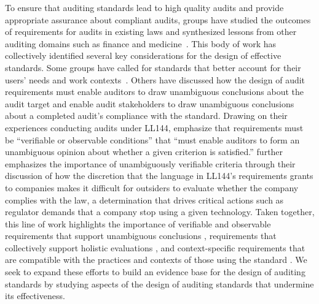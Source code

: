 To ensure that auditing standards lead to high quality audits and provide appropriate assurance about compliant audits, groups have studied the outcomes of requirements for audits in existing laws and synthesized lessons from other auditing domains such as finance and medicine~\cite{raji2022outsider, wright2024null, groves2024auditing, lam2024framework, gerchick2025auditing}. This body of work has collectively identified several key considerations for the design of effective standards. Some groups have called for standards that better account for their users' needs and work contexts~\cite{ojewale2025towards, schor2024mind}. Others have discussed how the design of audit requirements must enable auditors to draw unambiguous conclusions about the audit target and enable audit stakeholders to draw unambiguous conclusions about a completed audit's compliance with the standard. Drawing on their experiences conducting audits under LL144, \citet{lam2024framework} emphasize that requirements must be ``verifiable or observable conditions'' that ``must enable auditors to form an unambiguous opinion about whether a given criterion is satisfied.'' \citet{wright2024null} further emphasizes the importance of unambiguously verifiable criteria through their discussion of how the discretion that the language in LL144's requirements grants to companies makes it difficult for outsiders to evaluate whether the company complies with the law, a determination that drives critical actions such as regulator demands that a company stop using a given technology. Taken together, this line of work highlights the importance of verifiable and observable requirements that support unambiguous conclusions \cite{lam2024framework, wright2024null, raji2022outsider}, requirements that collectively support holistic evaluations \cite{lam2024framework}, and context-specific requirements that are compatible with the practices and contexts of those using the standard \cite{schor2024mind, ojewale2025towards}. We seek to expand these efforts to build an evidence base for the design of auditing standards by studying aspects of the design of auditing standards that undermine its effectiveness. 



